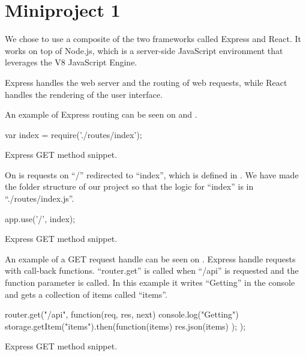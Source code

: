 \chapter{Miniproject 1}
We chose to use a composite of the two frameworks called Express and React. 
It works on top of Node.js, which is a server-side JavaScript environment that leverages the V8 JavaScript Engine. 

Express handles the web server and the routing of web requests, while React handles the rendering of the user interface.

An example of Express routing can be seen on  and .

\begin{listing}
    \begin{js}
        var index = require('./routes/index');
    \end{js}
    \caption{Express GET method snippet.}
    \label{lst:express_route}
\end{listing}

On  is requests on ``/'' redirected to ``index'', which is defined in .
We have made the folder structure of our project so that the logic for ``index'' is in ``./routes/index.js''.

\begin{listing}
    \begin{js}
        app.use('/', index);
    \end{js}
    \caption{Express GET method snippet.}
    \label{lst:express_route_use}
\end{listing}

An example of a GET request handle can be seen on .
Express handle requests with call-back functions.
``router.get'' is called when ``/api'' is requested and the function parameter is called. 
In this example it writes ``Getting'' in the console and gets a collection of items called ``items''.

\begin{listing}
    \begin{js}
        router.get("/api", function(req, res, next) {
            console.log("Getting")
            storage.getItem("items").then(function(items) {
                res.json(items)
            });
        });
    \end{js}
    \caption{Express GET method snippet.}
    \label{lst:express_get}
\end{listing}

